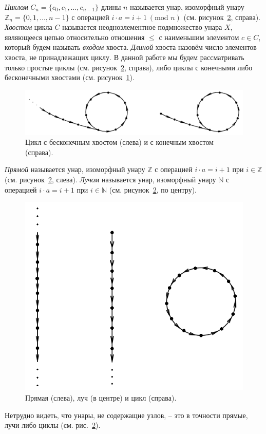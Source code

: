 \documentclass[11pt,twoside,final
]{article}
\begin{document}
\textit{Циклом} $C_n = \{ c_0, c_1, \ldots, c_{n - 1} \}$ длины $n$ называется унар, изоморфный унару $\mathbb{Z}_n = \{ 0, 1, \ldots, n - 1 \}$ с операцией $i \cdot a = i + 1 \ (\textrm{mod } n)$ (см. рисунок~\ref{fig:line_ray_cycle}, справа).
\textit{Хвостом} цикла $C$ называется неодноэлементное подмножество унара $X$, являющееся цепью относительно отношения $\leqslant$ с наименьшим элементом $c \in C$, который будем называть \textit{входом} хвоста.
\textit{Длиной} хвоста назовём число элементов хвоста, не принадлежащих циклу.
В данной работе мы будем рассматривать только простые циклы (см. рисунок~\ref{fig:line_ray_cycle}, справа), либо циклы с конечными либо бесконечными хвостами (см. рисунок~\ref{fig:tails}).
\begin{figure}[ht!]
	\centering
	\includegraphics[scale=0.4]{img/tails.png}
	\caption{Цикл с бесконечным хвостом (слева) и с конечным хвостом (справа).}
	\label{fig:tails}
\end{figure}
\textit{Прямой} называется унар, изоморфный унару $\mathbb{Z}$ с операцией $i \cdot a = i + 1$ при $i \in \mathbb{Z}$ (см. рисунок~\ref{fig:line_ray_cycle}, слева).
\textit{Лучом} называется унар, изоморфный унару $\mathbb{N}$ с операцией $i \cdot a = i + 1$ при $i \in \mathbb{N}$ (см. рисунок~\ref{fig:line_ray_cycle}, по центру).
\begin{figure}[ht!]
	\centering
	\includegraphics[scale=0.5]{img/line_ray_cycle.png}
	\caption{Прямая (слева), луч (в центре) и цикл (справа).}
	\label{fig:line_ray_cycle}
\end{figure}
Нетрудно видеть, что унары, не содержащие узлов, -- это в точности прямые, лучи либо циклы (см. рис.~\ref{fig:line_ray_cycle}).
\end{document}
